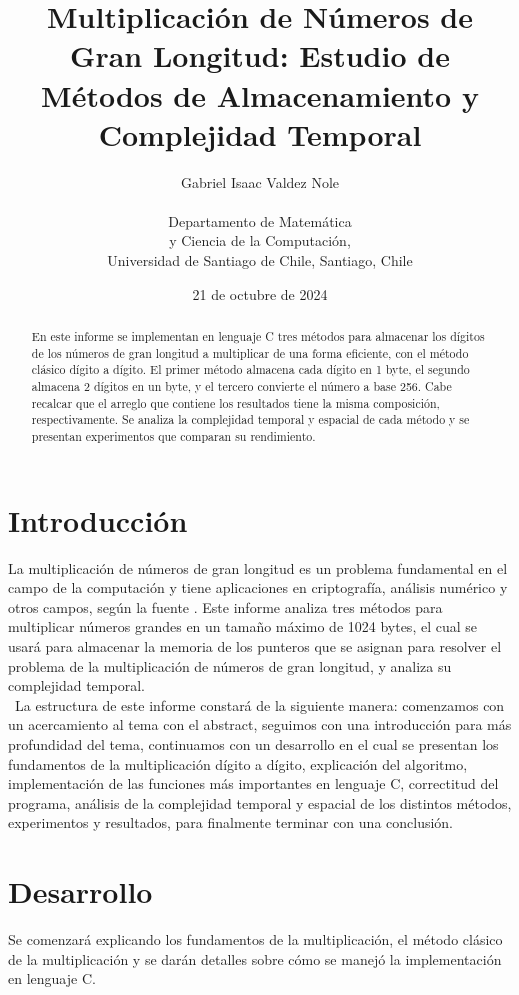 \documentclass[10pt]{article}
\title{Multiplicación de Números de Gran Longitud: Estudio de Métodos de Almacenamiento y Complejidad Temporal}
\author{Gabriel Isaac Valdez Nole\\ \\ Departamento de Matemática \\ y Ciencia de la Computación, \\Universidad de Santiago de Chile, Santiago, Chile}
\date{21 de octubre de 2024}
\begin{document}
\maketitle

\begin{abstract}
En este informe se implementan en lenguaje C tres métodos para almacenar los dígitos de los números de gran longitud a multiplicar de una forma eficiente, con el método clásico dígito a dígito. El primer método almacena cada dígito en 1 byte, el segundo almacena 2 dígitos en un byte, y el tercero convierte el número a base 256. Cabe recalcar que el arreglo que contiene los resultados tiene la misma composición, respectivamente. Se analiza la complejidad temporal y espacial de cada método y se presentan experimentos que comparan su rendimiento.
\end{abstract}

\section{Introducción}
La multiplicación de números de gran longitud es un problema fundamental en el campo de la computación y tiene aplicaciones en criptografía, análisis numérico y otros campos, según la fuente \cite{X1}. Este informe analiza tres métodos para multiplicar números grandes en un tamaño máximo de 1024 bytes, el cual se usará para almacenar la memoria de los punteros que se asignan para resolver el problema de la multiplicación de números de gran longitud, y analiza su complejidad temporal.\\\
La estructura de este informe constará de la siguiente manera: comenzamos con un acercamiento al tema con el abstract, seguimos con una introducción para más profundidad del tema, continuamos con un desarrollo en el cual se presentan los fundamentos de la multiplicación dígito a dígito, explicación del algoritmo, implementación de las funciones más importantes en lenguaje C, correctitud del programa, análisis de la complejidad temporal y espacial de los distintos métodos, experimentos y resultados, para finalmente terminar con una conclusión.

\section{Desarrollo}
Se comenzará explicando los fundamentos de la multiplicación, el método clásico de la multiplicación y se darán detalles sobre cómo se manejó la implementación en lenguaje C.
\end{document}
